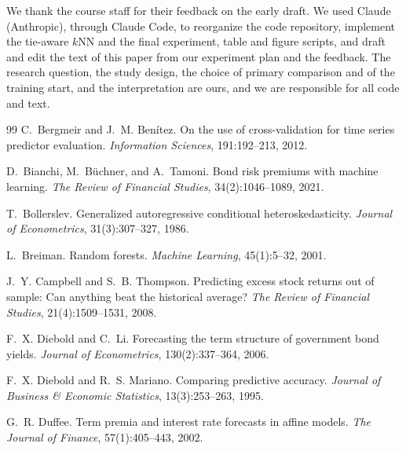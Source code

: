 \documentclass{article}
\begin{document}
\begin{ack}
We thank the course staff for their feedback on the early draft. We used Claude (Anthropic), through Claude Code, to reorganize the code repository, implement the tie-aware $k$NN and the final experiment, table and figure scripts, and draft and edit the text of this paper from our experiment plan and the feedback. The research question, the study design, the choice of primary comparison and of the training start, and the interpretation are ours, and we are responsible for all code and text.
\end{ack}

{\raggedright
\begin{thebibliography}{99}
C.~Bergmeir and J.~M. Ben\'itez. On the use of cross-validation for time series predictor evaluation. \emph{Information Sciences}, 191:192--213, 2012.

D.~Bianchi, M.~B\"uchner, and A.~Tamoni. Bond risk premiums with machine learning. \emph{The Review of Financial Studies}, 34(2):1046--1089, 2021.

T.~Bollerslev. Generalized autoregressive conditional heteroskedasticity. \emph{Journal of Econometrics}, 31(3):307--327, 1986.

L.~Breiman. Random forests. \emph{Machine Learning}, 45(1):5--32, 2001.

J.~Y. Campbell and S.~B. Thompson. Predicting excess stock returns out of sample: Can anything beat the historical average? \emph{The Review of Financial Studies}, 21(4):1509--1531, 2008.

F.~X. Diebold and C.~Li. Forecasting the term structure of government bond yields. \emph{Journal of Econometrics}, 130(2):337--364, 2006.

F.~X. Diebold and R.~S. Mariano. Comparing predictive accuracy. \emph{Journal of Business \& Economic Statistics}, 13(3):253--263, 1995.

G.~R. Duffee. Term premia and interest rate forecasts in affine models. \emph{The Journal of Finance}, 57(1):405--443, 2002.


\end{thebibliography}}
\end{document}
